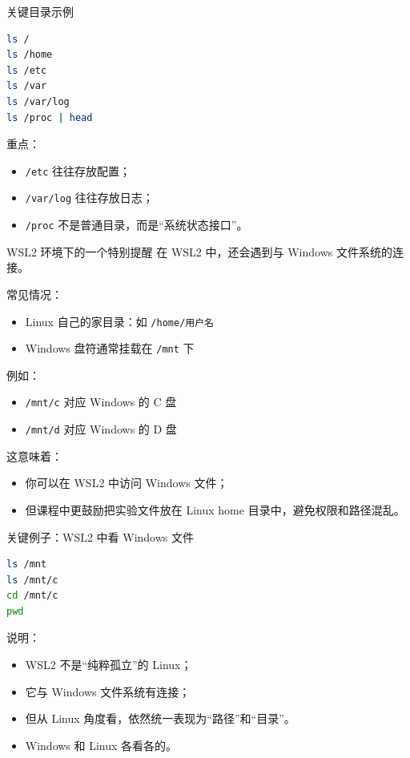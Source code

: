 \documentclass[aspectratio=169]{beamer}
\begin{document}
\begin{frame}[fragile]{关键目录示例}
\begin{lstlisting}[language=bash]
ls /
ls /home
ls /etc
ls /var
ls /var/log
ls /proc | head
\end{lstlisting}

\vspace{0.5em}
重点：
\begin{itemize}
  \item \texttt{/etc} 往往存放配置；
  \item \texttt{/var/log} 往往存放日志；
  \item \texttt{/proc} 不是普通目录，而是“系统状态接口”。
\end{itemize}
\end{frame}

\begin{frame}{WSL2 环境下的一个特别提醒}
在 WSL2 中，还会遇到与 Windows 文件系统的连接。

常见情况：
\begin{itemize}
  \item Linux 自己的家目录：如 \texttt{/home/用户名}
  \item Windows 盘符通常挂载在 \texttt{/mnt} 下
\end{itemize}

例如：
\begin{itemize}
  \item \texttt{/mnt/c} 对应 Windows 的 C 盘
  \item \texttt{/mnt/d} 对应 Windows 的 D 盘
\end{itemize}

这意味着：
\begin{itemize}
  \item 你可以在 WSL2 中访问 Windows 文件；
  \item 但课程中更鼓励把实验文件放在 Linux home 目录中，避免权限和路径混乱。
\end{itemize}
\end{frame}

\begin{frame}[fragile]{关键例子：WSL2 中看 Windows 文件}
\begin{lstlisting}[language=bash]
ls /mnt
ls /mnt/c
cd /mnt/c
pwd
\end{lstlisting}

\vspace{0.5em}
说明：
\begin{itemize}
  \item  WSL2 不是“纯粹孤立”的 Linux；
  \item 它与 Windows 文件系统有连接；
  \item 但从 Linux 角度看，依然统一表现为“路径”和“目录”。
  \item Windows 和 Linux 各看各的。
\end{itemize}
\end{frame}
\end{document}
